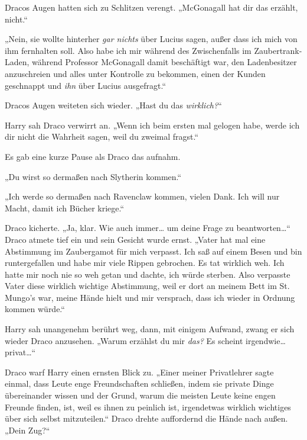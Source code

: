 {Dracos Augen hatten sich zu Schlitzen verengt. „McGonagall hat dir das erzählt, nicht.“

„Nein, sie wollte hinterher \emph{gar nichts} über Lucius sagen, außer dass ich mich von ihm fernhalten soll. Also habe ich mir während des Zwischenfalls im Zaubertrank-Laden, während Professor McGonagall damit beschäftigt war, den Ladenbesitzer anzuschreien und alles unter Kontrolle zu bekommen, einen der Kunden geschnappt und \emph{ihn} über Lucius ausgefragt.“

Dracos Augen weiteten sich wieder. „Hast du das \emph{wirklich?}“

Harry sah Draco verwirrt an. „Wenn ich beim ersten mal gelogen habe, werde ich dir nicht die Wahrheit sagen, weil du zweimal fragst.“

Es gab eine kurze Pause als Draco das aufnahm.

„Du wirst so dermaßen nach Slytherin kommen.“

„Ich werde so dermaßen nach Ravenclaw kommen, vielen Dank. Ich will nur Macht, damit ich Bücher kriege.“

Draco kicherte. „Ja, klar. Wie auch immer… um deine Frage zu beantworten…“ Draco atmete tief ein und sein Gesicht wurde ernst. „Vater hat mal eine Abstimmung im Zaubergamot für mich verpasst. Ich saß auf einem Besen und bin runtergefallen und habe mir viele Rippen gebrochen. Es tat wirklich weh. Ich hatte mir noch nie so weh getan und dachte, ich würde sterben. Also verpasste Vater diese wirklich wichtige Abstimmung, weil er dort an meinem Bett im St. Mungo's war, meine Hände hielt und mir versprach, dass ich wieder in Ordnung kommen würde.“

Harry sah unangenehm berührt weg, dann, mit einigem Aufwand, zwang er sich wieder Draco anzusehen. „Warum erzählst du mir \emph{das?} Es scheint irgendwie… privat…“

Draco warf Harry einen ernsten Blick zu. „Einer meiner Privatlehrer sagte einmal, dass Leute enge Freundschaften schließen, indem sie private Dinge übereinander wissen und der Grund, warum die meisten Leute keine engen Freunde finden, ist, weil es ihnen zu peinlich ist, irgendetwas wirklich wichtiges über sich selbst mitzuteilen.“ Draco drehte auffordernd die Hände nach außen. „Dein Zug?“

}
